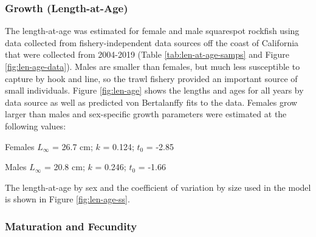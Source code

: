 \documentclass[11pt,
  english,
  a4paper,
]{article}
\begin{document}
\leavevmode\tagmcend\tagstructend\par


\hypertarget{growth-length-at-age}{%
\subsubsection{Growth (Length-at-Age)}\label{growth-length-at-age}}

\leavevmode\tagmcend\tagstructend


The length-at-age was estimated for female and male squarespot rockfish using data collected from fishery-independent data sources off the coast of California that were collected from 2004-2019 (Table \ref{tab:len-at-age-samps} and Figure \ref{fig:len-age-data}). Males are smaller than females, but much less susceptible to capture by hook and line, so the trawl fishery provided an important source of small individuals. Figure \ref{fig:len-age} shows the lengths and ages for all years by data source as well as predicted von Bertalanffy fits to the data. Females grow larger than males and sex-specific growth parameters were estimated at the following values:

\leavevmode\tagmcend\tagstructend\par

\begin{centering}

Females $L_{\infty}$ = 26.7 cm; $k$ = 0.124; $t_0$ = -2.85

Males $L_{\infty}$ = 20.8 cm; $k$ = 0.246; $t_0$ = -1.66

\end{centering}

\vspace{0.5cm}


The length-at-age by sex and the coefficient of variation by size used in the model is shown in Figure \ref{fig:len-age-ss}.

\leavevmode\tagmcend\tagstructend\par


\hypertarget{maturation-and-fecundity}{%
\subsubsection{Maturation and Fecundity}\label{maturation-and-fecundity}}
\end{document}
